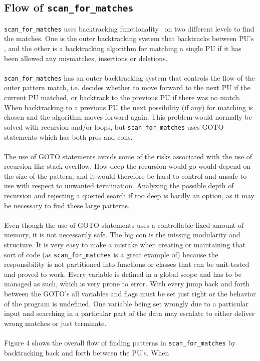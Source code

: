 \documentclass[12pt]{article}
\newcommand{\scm}{\texttt{scan\_for\_matches} }
\newcommand{\pu}{PU }
\newcommand{\pus}{PU's }
\begin{document}
\subsection{Flow of \scm}
\scm uses backtracking functionality~\cite{back} on two different levels to find the matches. 
One is the outer backtracking system that backtracks between \pus, and the other is a backtracking algorithm
for matching a single \pu if it has been allowed any mismatches, insertions or deletions. \\ \\
\scm has an outer backtracking system that controls the flow of the outer pattern match, i.e. decides whether to
move forward to the next \pu if the current \pu matched, or backtrack to the previous \pu if there was no match.
When backtracking to a previous \pu the next possibility (if any) for matching is chosen and the algorithm moves
forward again. This problem would normally be solved with recursion and/or loops, but \scm uses GOTO statements which has 
both pros and cons. \\ \\
The use of GOTO statements avoids some of the risks associated with the use of recursion like stack overflow. 
How deep the recursion would go would depend on the size of the pattern, and it would therefore be hard to control and
unsafe to use with respect to unwanted termination. Analyzing the possible depth of recursion and rejecting a queried search
if too deep is hardly an option, as it may be necessary to find these large patterns. \\ \\
Even though the use of GOTO statements uses a controllable fixed amount of
memory, it is not necessarily safe. The big con is the missing modularity and structure. 
It is very easy to make a mistake when creating or maintaining that sort of code
(as \scm is a great example of)
because the responsibility is not partitioned into functions or classes that can be unit-tested and proved to work.
Every variable is defined in a global scope and has to be managed as such, which is very prone to error. With every
jump back and forth between the GOTO's all variables and flags must be set just right or the behavior of the program
is undefined. 
One variable being set wrongly due to a particular input and searching in a particular part of the data may 
escalate to either deliver wrong matches or just terminate. \\ \\
Figure 4 shows the overall flow of finding patterns in \scm by backtracking back and forth between the PU's. When
\end{document}
